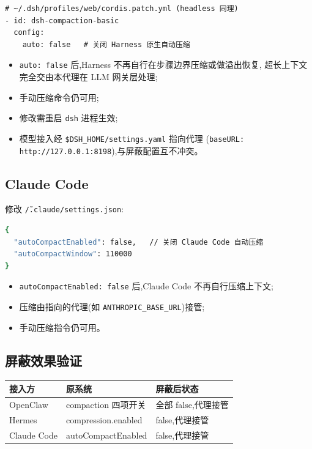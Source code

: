 \documentclass[11pt,a4paper]{article}
\begin{document}
\begin{lstlisting}[language={}]
# ~/.dsh/profiles/web/cordis.patch.yml (headless 同理)
- id: dsh-compaction-basic
  config:
    auto: false   # 关闭 Harness 原生自动压缩
\end{lstlisting}

\begin{itemize}
  \item \texttt{auto: false} 后,Harness 不再自行在步骤边界压缩或做溢出恢复,
        超长上下文完全交由本代理在 LLM 网关层处理;
  \item 手动压缩命令仍可用;
  \item 修改需重启 \texttt{dsh} 进程生效;
  \item 模型接入经 \texttt{\$DSH\_HOME/settings.yaml} 指向代理
        (\texttt{baseURL: http://127.0.0.1:8198}),与屏蔽配置互不冲突。
\end{itemize}

\subsection{Claude Code}

修改 \texttt{\~/.claude/settings.json}:

\begin{lstlisting}[language=bash]
{
  "autoCompactEnabled": false,   // 关闭 Claude Code 自动压缩
  "autoCompactWindow": 110000
}
\end{lstlisting}

\begin{itemize}
  \item \texttt{autoCompactEnabled: false} 后,Claude Code 不再自行压缩上下文;
  \item 压缩由指向的代理(如 \texttt{ANTHROPIC\_BASE\_URL})接管;
  \item 手动压缩指令仍可用。
\end{itemize}

\subsection{屏蔽效果验证}

\begin{table}[h]
  \centering
  \begin{tabular}{@{}lp{5.5cm}p{4cm}@{}}
    \toprule
    接入方 & 原系统 & 屏蔽后状态 \\
    \midrule
    OpenClaw & compaction 四项开关 & 全部 false,代理接管 \\
    Hermes & compression.enabled & false,代理接管 \\
    Claude Code & autoCompactEnabled & false,代理接管 \\
    \bottomrule
  \end{tabular}
\end{table}
\end{document}
